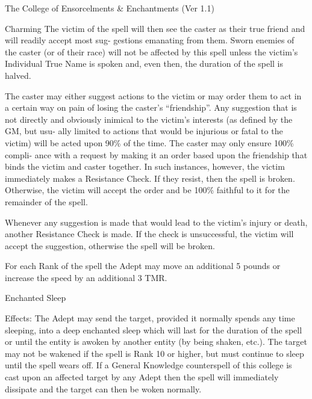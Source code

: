 \begin{Chapter}{The College of Ensorcelments \& Enchantments (Ver 1.1)}
\begin{spell}[G-1]{Charming }
The  victim  of  the  spell  will  then  see  the  caster  as 
their  true  friend  and  will  readily  accept  most  sug-
gestions  emanating  from  them.  Sworn  enemies  of 
the caster (or of their race) will not be affected by 
this spell unless the victim’s Individual True Name 
is  spoken  and,  even  then,  the  duration  of  the  spell 
is halved. 

The caster may either suggest actions to the victim 
or  may  order  them to  act in  a  certain  way  on  pain 
of losing the caster’s “friendship”. Any suggestion 
that  is  not  directly  and  obviously  inimical  to  the 
victim’s  interests  (as  defined  by  the  GM,  but usu-
ally  limited  to  actions  that  would  be  injurious  or 
fatal  to  the  victim)  will  be  acted  upon  90\%  of  the 
time.  The  caster  may  only  ensure  100\%  compli-
ance  with  a  request  by  making  it  an  order  based 
upon the friendship that binds the victim and caster 
together.  In  such  instances,  however,  the  victim 
immediately  makes  a  Resistance  Check.  If  they 
resist,  then  the  spell  is  broken.  Otherwise,  the 
victim  will  accept  the  order  and  be  100\%  faithful 
to it for the remainder of the spell. 

Whenever any suggestion is made that would lead 
to  the  victim’s  injury  or  death,  another  Resistance 
Check  is  made.  If  the  check  is  unsuccessful,  the 
victim  will  accept  the  suggestion,  otherwise  the 
spell will be broken. 

For each Rank of the spell the Adept may move an 
additional  5  pounds  or  increase  the  speed  by  an 
additional 3 TMR. 

\end{spell}

\begin{spell}[G-3]{Enchanted Sleep }

Effects: The Adept may send the target, provided it 
normally  spends  any  time  sleeping,  into  a  deep 
enchanted sleep which will last for the duration of 
the  spell  or  until  the  entity  is  awoken  by  another 
entity  (by  being  shaken,  etc.).  The  target  may  not 
be  wakened  if  the  spell  is  Rank  10  or  higher,  but 
must continue to sleep until the spell wears off. If a 
General  Knowledge  counterspell  of  this  college  is 
cast upon an affected target by any Adept then the 
spell  will  immediately  dissipate  and the  target  can 
then be woken normally. 


\end{spell}
\end{Chapter}
